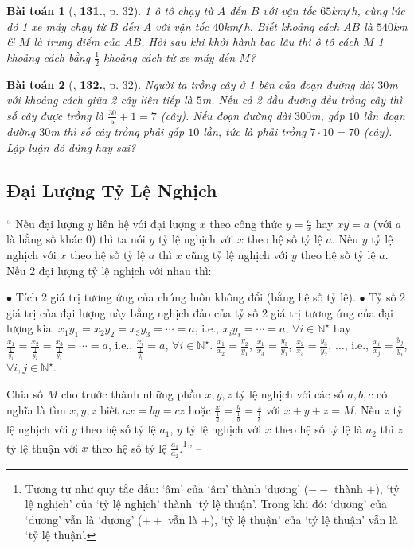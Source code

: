 \documentclass{article}
\newtheorem{baitoan}{Bài toán}
\begin{document}
\begin{baitoan}[\cite{Tuyen_Toan_7}, \textbf{131.}, p. 32]
	1 ô tô chạy từ $A$ đến $B$ với vận tốc $65$\emph{km\texttt{/}h}, cùng lúc đó 1 xe máy chạy từ $B$ đến $A$ với vận tốc $40$\emph{km\texttt{/}h}. Biết khoảng cách $AB$ là $540$\emph{km} \& $M$ là trung điểm của $AB$. Hỏi sau khi khởi hành bao lâu thì ô tô cách $M$ 1 khoảng cách bằng $\frac{1}{2}$ khoảng cách từ xe máy đến $M$?
\end{baitoan}

\begin{baitoan}[\cite{Tuyen_Toan_7}, \textbf{132.}, p. 32]
	Người ta trồng cây ở 1 bên của đoạn đường dài $30$\emph{m} với khoảng cách giữa 2 cây liên tiếp là $5$\emph{m}. Nếu cả 2 đầu đường đều trồng cây thì số cây được trồng là $\frac{30}{5} + 1 = 7$ (cây). Nếu đoạn đường dài $300$\emph{m}, gấp $10$ lần đoạn đường $30$\emph{m} thì số cây trồng phải gấp $10$ lần, tức là phải trồng $7\cdot 10 = 70$ (cây). Lập luận đó đúng hay sai?
\end{baitoan}


\subsection{Đại Lượng Tỷ Lệ Nghịch}
``
	 Nếu đại lượng $y$ liên hệ với đại lượng $x$ theo công thức $y = \frac{a}{x}$ hay $xy = a$ (với $a$ là hằng số khác $0$) thì ta nói $y$ tỷ lệ nghịch với $x$ theo hệ số tỷ lệ $a$. Nếu $y$ tỷ lệ nghịch với $x$ theo hệ số tỷ lệ $a$ thì $x$ cũng tỷ lệ nghịch với $y$ theo hệ số tỷ lệ $a$.
	 Nếu 2 đại lượng tỷ lệ nghịch với nhau thì:
	
		$\bullet$ Tích 2 giá trị tương ứng của chúng luôn không đổi (bằng hệ số tỷ lệ).
		$\bullet$ Tỷ số 2 giá trị của đại lượng này bằng nghịch đảo của tỷ số 2 giá trị tương ứng của đại lượng kia. $x_1y_1 = x_2y_2 = x_3y_3 = \cdots = a$, i.e., $x_iy_i = \cdots = a$, $\forall i\in\mathbb{N}^\star$ hay $\frac{x_1}{\frac{1}{y_1}} = \frac{x_2}{\frac{1}{y_2}} = \frac{x_3}{\frac{1}{y_3}} = \cdots = a$, i.e., $\frac{x_i}{\frac{1}{y_i}} = a$, $\forall i\in\mathbb{N}^\star$. $\frac{x_1}{x_2} = \frac{y_2}{y_1}$, $\frac{x_1}{x_3} = \frac{y_3}{y_1}$, $\frac{x_2}{x_3} = \frac{y_3}{y_2}$, $\ldots$, i.e., $\frac{x_i}{x_j} = \frac{y_j}{y_i}$, $\forall i,j\in\mathbb{N}^\star$.
	
	 Chia số $M$ cho trước thành những phần $x,y,z$ tỷ lệ nghịch với các số $a,b,c$ có nghĩa là tìm $x,y,z$ biết $ax = by = cz$ hoặc $\frac{x}{\frac{1}{a}} = \frac{y}{\frac{1}{b}} = \frac{z}{\frac{1}{c}}$ với $x + y + z = M$.
	 Nếu $z$ tỷ lệ nghịch với $y$ theo hệ số tỷ lệ $a_1$, $y$ tỷ lệ nghịch với $x$ theo hệ số tỷ lệ là $a_2$ thì $z$ tỷ lệ thuận với $x$ theo hệ số tỷ lệ $\frac{a_1}{a_2}$.\footnote{Tương tự như quy tắc dấu: `âm' của `âm' thành `dương' ($--$ thành $+$), `tỷ lệ nghịch' của `tỷ lệ nghịch' thành `tỷ lệ thuận'. Trong khi đó: `dương' của `dương' vẫn là `dương' ($++$ vẫn là $+$), `tỷ lệ thuận' của `tỷ lệ thuận' vẫn là `tỷ lệ thuận'.}'' -- \cite[Chap. 2, \S8, p. 33]{Tuyen_Toan_7}
\end{document}
